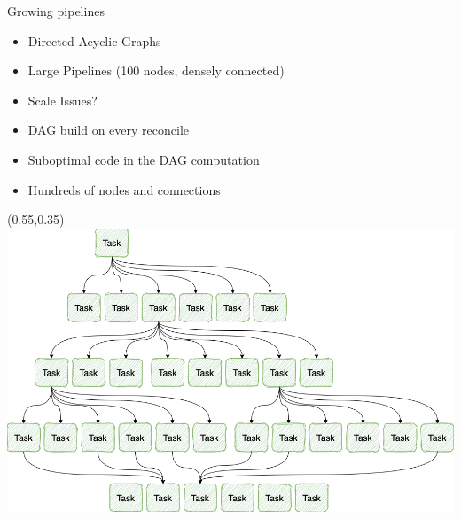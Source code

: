 \documentclass[aspectratio=169,11pt,hyperref={colorlinks=true}]{beamer}
\begin{document}
{
\begin{tblackbgrayframe}{Growing pipelines}
  \begin{itemize}
    \item Directed Acyclic Graphs
    \item Large Pipelines (100 nodes, densely connected)
    \item Scale Issues?
  \end{itemize}
  \begin{itemize}
    \item DAG build on every reconcile
    \item Suboptimal code in the DAG computation
    \item Hundreds of nodes and connections
  \end{itemize}
  \begin{textblock*}{0.42\paperwidth}(0.55\paperwidth,0.35\paperheight)
    \includegraphics[width=0.42\paperwidth]{img/tekton-large-dag.png}
  \end{textblock*}
\end{tblackbgrayframe}
}
\end{document}
